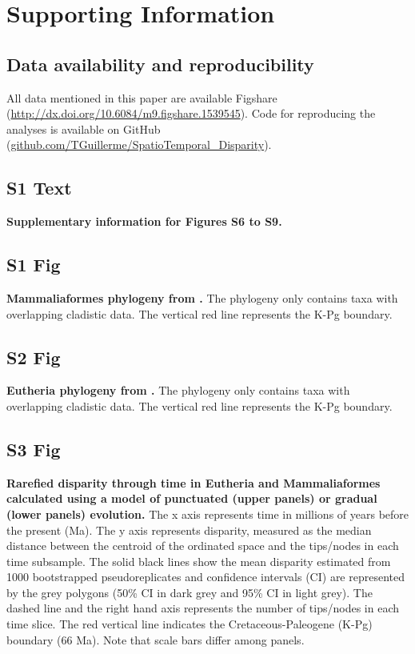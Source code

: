 \documentclass[10pt,letterpaper]{article}
\begin{document}
\section*{Supporting Information}

\subsection*{Data availability and reproducibility} %
All data mentioned in this paper are available Figshare (\url{http://dx.doi.org/10.6084/m9.figshare.1539545}).
Code for reproducing the analyses is available on GitHub (\url{github.com/TGuillerme/SpatioTemporal_Disparity}).

\subsection*{S1 Text}
\label{S1_Text}
{\bf Supplementary information for Figures S6 to S9.}

\subsection*{S1 Fig}
\label{S1_Fig}
{\bf Mammaliaformes phylogeny from \cite{Slater2012MEE}.} The phylogeny only contains taxa with overlapping cladistic data. The vertical red line represents the K-Pg boundary.

\subsection*{S2 Fig}
\label{S2_Fig}
{\bf Eutheria phylogeny from \cite{beckancient2014}.} The phylogeny only contains taxa with overlapping cladistic data. The vertical red line represents the K-Pg boundary.

\subsection*{S3 Fig}
\label{S3_Fig}
{\bf Rarefied disparity through time in Eutheria and Mammaliaformes calculated using a model of punctuated (upper panels) or gradual (lower panels) evolution.} The x axis represents time in millions of years before the present (Ma). The y axis represents disparity, measured as the median distance between the centroid of the ordinated space and the tips/nodes in each time subsample. The solid black lines show the mean disparity estimated from 1000 bootstrapped pseudoreplicates and confidence intervals (CI) are represented by the grey polygons (50\% CI in dark grey and 95\% CI in light grey). The dashed line and the right hand axis represents the number of tips/nodes in each time slice. The red vertical line indicates the Cretaceous-Paleogene (K-Pg) boundary (66 Ma). Note that scale bars differ among panels.
\end{document}

